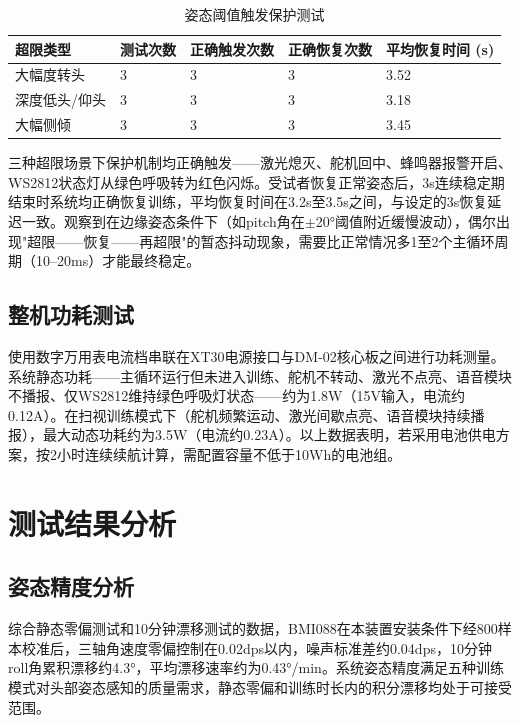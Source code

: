 \begin{table}[h!]
\centering
\caption{姿态阈值触发保护测试}
\label{tab:safety_trigger}
\begin{tabular}{p{3cm} p{2cm} p{2.5cm} p{3cm} p{2.5cm}}
\toprule[1.5pt]
\textbf{超限类型} & \textbf{测试次数} & \textbf{正确触发次数} & \textbf{正确恢复次数} & \textbf{平均恢复时间 (s)} \\
\midrule[1pt]
大幅度转头 & 3 & 3 & 3 & 3.52 \\
深度低头/仰头 & 3 & 3 & 3 & 3.18 \\
大幅侧倾 & 3 & 3 & 3 & 3.45 \\
\bottomrule[1.5pt]
\end{tabular}
\end{table}

三种超限场景下保护机制均正确触发——激光熄灭、舵机回中、蜂鸣器报警开启、WS2812状态灯从绿色呼吸转为红色闪烁。受试者恢复正常姿态后，3s连续稳定期结束时系统均正确恢复训练，平均恢复时间在3.2s至3.5s之间，与设定的3s恢复延迟一致。观察到在边缘姿态条件下（如pitch角在$\pm$20°阈值附近缓慢波动），偶尔出现"超限——恢复——再超限"的暂态抖动现象，需要比正常情况多1至2个主循环周期（10--20ms）才能最终稳定。

\subsection{整机功耗测试}

使用数字万用表电流档串联在XT30电源接口与DM-02核心板之间进行功耗测量。系统静态功耗——主循环运行但未进入训练、舵机不转动、激光不点亮、语音模块不播报、仅WS2812维持绿色呼吸灯状态——约为1.8W（15V输入，电流约0.12A）。在扫视训练模式下（舵机频繁运动、激光间歇点亮、语音模块持续播报），最大动态功耗约为3.5W（电流约0.23A）。以上数据表明，若采用电池供电方案，按2小时连续续航计算，需配置容量不低于10Wh的电池组。

\section{测试结果分析}

\subsection{姿态精度分析}

综合静态零偏测试和10分钟漂移测试的数据，BMI088在本装置安装条件下经800样本校准后，三轴角速度零偏控制在0.02dps以内，噪声标准差约0.04dps，10分钟roll角累积漂移约4.3°，平均漂移速率约为0.43°/min。系统姿态精度满足五种训练模式对头部姿态感知的质量需求，静态零偏和训练时长内的积分漂移均处于可接受范围。

